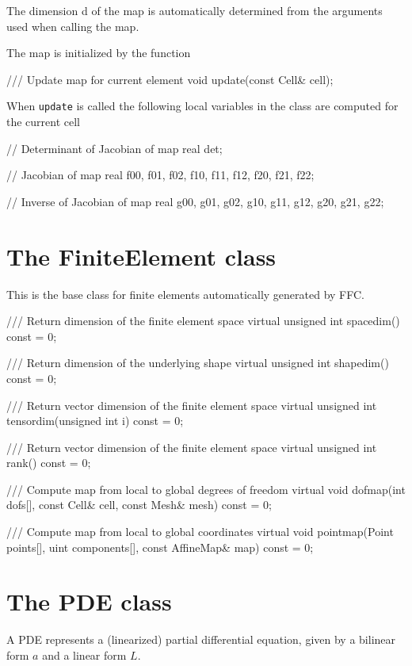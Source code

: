 The dimension d of the map is automatically determined from the
arguments used when calling the map.

The map is initialized by the function 
\begin{code}
/// Update map for current element
void update(const Cell& cell);
\end{code}

When \texttt{update} is called the following local variables in the 
class are computed for the current cell 
\begin{code}
// Determinant of Jacobian of map
real det;

// Jacobian of map
real f00, f01, f02, f10, f11, f12, f20, f21, f22;

// Inverse of Jacobian of map
real g00, g01, g02, g10, g11, g12, g20, g21, g22;
\end{code}

\section{The FiniteElement class}

This is the base class for finite elements automatically
generated by FFC.

\begin{code}
/// Return dimension of the finite element space
virtual unsigned int spacedim() const = 0;

/// Return dimension of the underlying shape
virtual unsigned int shapedim() const = 0;

/// Return vector dimension of the finite element space
virtual unsigned int tensordim(unsigned int i) const = 0;

/// Return vector dimension of the finite element space
virtual unsigned int rank() const = 0;
    
/// Compute map from local to global degrees of freedom
virtual void dofmap(int dofs[], const Cell& cell, 
                    const Mesh& mesh) const = 0;

/// Compute map from local to global coordinates
virtual void pointmap(Point points[], uint components[], 
                      const AffineMap& map) const = 0;
\end{code}

\section{The PDE class}

A PDE represents a (linearized) partial differential equation,
given by a bilinear form $a$ and a linear form $L$. 

